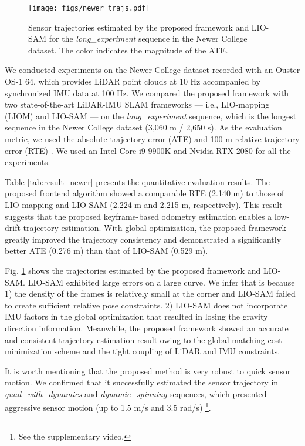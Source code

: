 \documentclass[letterpaper, 10 pt, conference]{ieeeconf}  %
\begin{document}
\begin{figure}[tb]
  \centering
  \texttt{[image: figs/newer\_trajs.pdf]}
  \caption{Sensor trajectories estimated by the proposed framework and LIO-SAM for the {\it long\_experiment} sequence in the Newer College dataset. The color indicates the magnitude of the ATE.}
  \label{fig:newer_trajs}
\end{figure}

We conducted experiments on the Newer College dataset \cite{Ramezani2020} recorded with an Ouster OS-1 64, which provides LiDAR point clouds at 10 Hz accompanied by synchronized IMU data at 100 Hz. We compared the proposed framework with two state-of-the-art LiDAR-IMU SLAM frameworks --- i.e., LIO-mapping (LIOM) \cite{Ye2019} and LIO-SAM \cite{liosam2020shan} --- on the {\it long\_experiment} sequence, which is the longest sequence in the Newer College dataset (3,060 m / 2,650 s). As the evaluation metric, we used the absolute trajectory error (ATE) and 100 m relative trajectory error (RTE) \cite{Zhang2018}. We used an Intel Core i9-9900K and Nvidia RTX 2080 for all the experiments.

Table \ref{tab:result_newer} presents the quantitative evaluation results. The proposed frontend algorithm showed a comparable RTE (2.140 m) to those of LIO-mapping and LIO-SAM (2.224 m and 2.215 m, respectively). This result suggests that the proposed keyframe-based odometry estimation enables a low-drift trajectory estimation.  With global optimization, the proposed framework greatly improved the trajectory consistency and demonstrated a significantly better ATE (0.276 m) than that of LIO-SAM (0.529 m).

Fig. \ref{fig:newer_trajs} shows the trajectories estimated by the proposed framework and LIO-SAM. LIO-SAM exhibited large errors on a large curve. We infer that is because 1) the density of the frames is relatively small at the corner and LIO-SAM failed to create sufficient relative pose constraints. 2) LIO-SAM does not incorporate IMU factors in the global optimization that resulted in losing the gravity direction information. Meanwhile, the proposed framework showed an accurate and consistent trajectory estimation result owing to the global matching cost minimization scheme and the tight coupling of LiDAR and IMU constraints. 

It is worth mentioning that the proposed method is very robust to quick sensor motion. We confirmed that it successfully estimated the sensor trajectory in {\it quad\_with\_dynamics} and {\it dynamic\_spinning} sequences, which presented aggressive sensor motion (up to 1.5 m/s and 3.5 rad/s) \footnote{See the supplementary video.}.
\end{document}
